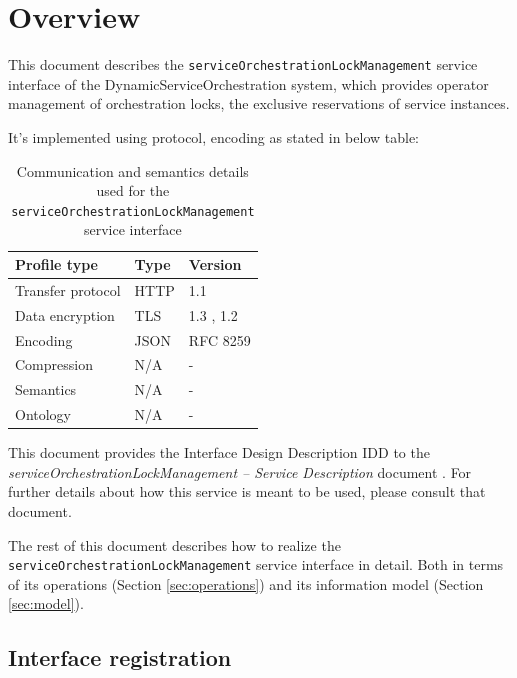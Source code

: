 \documentclass[a4paper]{arrowhead}
\begin{document}
\section{Overview}
\label{sec:overview}

This document describes the \texttt{service\allowbreak{}Orchestration\allowbreak{}Lock\allowbreak{}Management} service interface of the DynamicServiceOrchestration system, which provides operator management of orchestration locks, the exclusive reservations of service instances.

It's implemented using protocol, encoding as stated in below table:
\begin{table}[ht!]
  \centering
  \begin{tabular}{|l|l|l|}
    \hline
    \rowcolor{gray!33} Profile type & Type & Version \\ \hline
    Transfer protocol & HTTP & 1.1 \cite{rfc9112} \\ \hline
    Data encryption & TLS & 1.3 \cite{rfc8446}, 1.2 \cite{rfc5246} \\ \hline
    Encoding & JSON & RFC 8259 \cite{rfc8259} \\ \hline
    Compression & N/A & - \\ \hline
    Semantics & N/A & - \\ \hline
    Ontology & N/A & - \\ \hline
  \end{tabular}
  \caption{Communication and semantics details used for the \texttt{service\allowbreak{}Orchestration\allowbreak{}Lock\allowbreak{}Management} service interface}
  \label{tab:comunication_semantics_profile}
\end{table}

This document provides the Interface Design Description IDD to the \textit{serviceOrchestrationLockManagement -- Service Description} document \cite{dso-serviceOrchestrationLockManagement-sd}.
For further details about how this service is meant to be used, please consult that document.

The rest of this document describes how to realize the \texttt{service\allowbreak{}Orchestration\allowbreak{}Lock\allowbreak{}Management} service
interface in detail. Both in terms of its operations (Section \ref{sec:operations}) and its information model (Section \ref{sec:model}).

\subsection{Interface registration}
\end{document}
